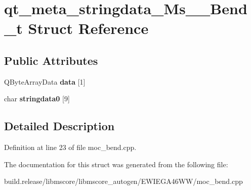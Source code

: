 \hypertarget{structqt__meta__stringdata___ms_____bend__t}{}\section{qt\+\_\+meta\+\_\+stringdata\+\_\+\+Ms\+\_\+\+\_\+\+Bend\+\_\+t Struct Reference}
\label{structqt__meta__stringdata___ms_____bend__t}
\subsection*{Public Attributes}
\begin{DoxyCompactItemize}
\item 
\mbox{\label{structqt__meta__stringdata___ms_____bend__t_a2dcf65d39ba80b60136a7fef893d2209}} 
Q\+Byte\+Array\+Data {\bfseries data} \mbox{[}1\mbox{]}
\item 
\mbox{\label{structqt__meta__stringdata___ms_____bend__t_ae6ee5bde565974276a9f6f49901ff478}} 
char {\bfseries stringdata0} \mbox{[}9\mbox{]}
\end{DoxyCompactItemize}


\subsection{Detailed Description}


Definition at line 23 of file moc\+\_\+bend.\+cpp.



The documentation for this struct was generated from the following file\+:\begin{DoxyCompactItemize}
\item 
build.\+release/libmscore/libmscore\+\_\+autogen/\+E\+W\+I\+E\+G\+A46\+W\+W/moc\+\_\+bend.\+cpp\end{DoxyCompactItemize}
